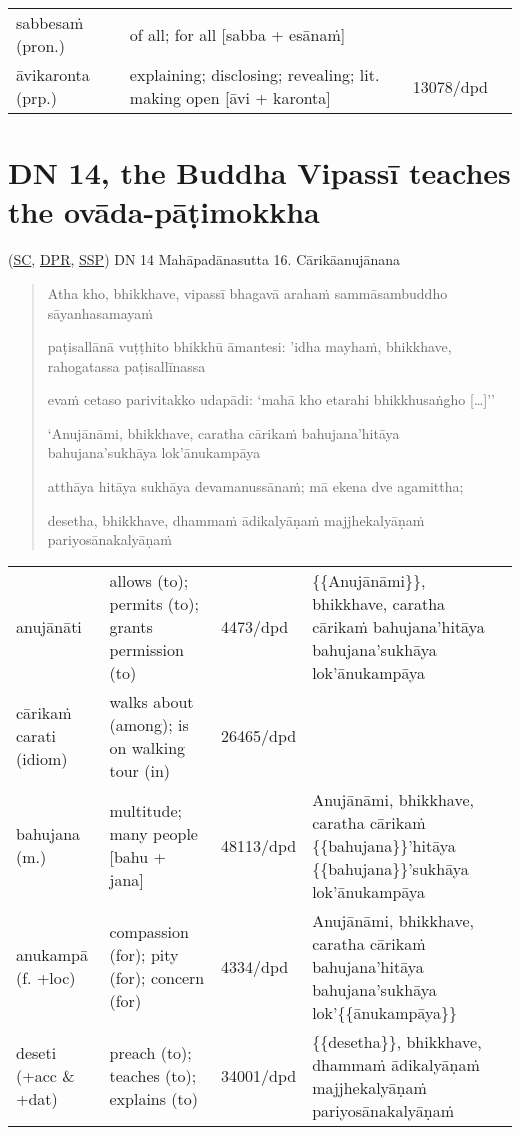 \documentclass[11pt,oneside]{memoir}
\begin{document}
\begin{longtable}{L{\colOne} L{\colTwo} H H}
sabbesaṁ (pron.) & of all; for all [sabba + esānaṁ] &  & \\[0pt]
āvikaronta (prp.) & explaining; disclosing; revealing; lit. making open [āvi + karonta] & 13078/dpd & \\[0pt]
\end{longtable}

\section{DN 14, the Buddha Vipassī teaches the ovāda-pāṭimokkha}
\label{sec:org5e0e5a9}
(\href{https://suttacentral.net/dn14/pli/ms}{SC}, \href{https://www.digitalpalireader.online/\_dprhtml/index.html?loc=d.1.0.0.0.0.15.m\&para=3}{DPR}, \href{http://localhost:4848/suttas/dn14/pli/ms?quote=pa\%25E1\%25B9\%25ADisall\%25C4\%2581n\%25C4\%2581\%2520vu\%25E1\%25B9\%25AD\%25E1\%25B9\%25ADhito\%2520bhikkh\%25C5\%25AB\%2520\%25C4\%2581mantesi\&window\_type=Sutta+Study}{SSP}) DN 14 Mahāpadānasutta 16. Cārikāanujānana

\vspace*{-0.5\baselineskip}
\enlargethispage*{1.5\baselineskip}

\begin{quote}
Atha kho, bhikkhave, vipassī bhagavā arahaṁ sammāsambuddho sāyanhasamayaṁ

paṭisallānā vuṭṭhito bhikkhū āmantesi: 'idha mayhaṁ, bhikkhave, rahogatassa paṭisallīnassa

evaṁ cetaso parivitakko udapādi: `mahā kho etarahi bhikkhusaṅgho [\ldots{}]''

‘Anujānāmi, bhikkhave, caratha cārikaṁ bahujana'hitāya bahujana'sukhāya lok'ānukampāya

atthāya hitāya sukhāya devamanussānaṁ; mā ekena dve agamittha;

desetha, bhikkhave, dhammaṁ ādikalyāṇaṁ majjhekalyāṇaṁ pariyosānakalyāṇaṁ
\end{quote}

\vspace*{-1pt}

\begin{longtable}{L{\colOne} L{\colTwo} H H}
anujānāti & allows (to); permits (to); grants permission (to) & 4473/dpd & \{\{Anujānāmi\}\}, bhikkhave, caratha cārikaṁ bahujana'hitāya bahujana'sukhāya lok'ānukampāya\\[0pt]
cārikaṁ carati (idiom) & walks about (among); is on walking tour (in) & 26465/dpd & \\[0pt]
bahujana (m.) & multitude; many people [bahu + jana] & 48113/dpd & Anujānāmi, bhikkhave, caratha cārikaṁ \{\{bahujana\}\}'hitāya \{\{bahujana\}\}'sukhāya lok'ānukampāya\\[0pt]
anukampā (f. +loc) & compassion (for); pity (for); concern (for) & 4334/dpd & Anujānāmi, bhikkhave, caratha cārikaṁ bahujana'hitāya bahujana'sukhāya lok'\{\{ānukampāya\}\}\\[0pt]
deseti  (+acc \& +dat) & preach (to); teaches (to); explains (to) & 34001/dpd & \{\{desetha\}\}, bhikkhave, dhammaṁ ādikalyāṇaṁ majjhekalyāṇaṁ pariyosānakalyāṇaṁ\\[0pt]
\end{longtable}
\end{document}
